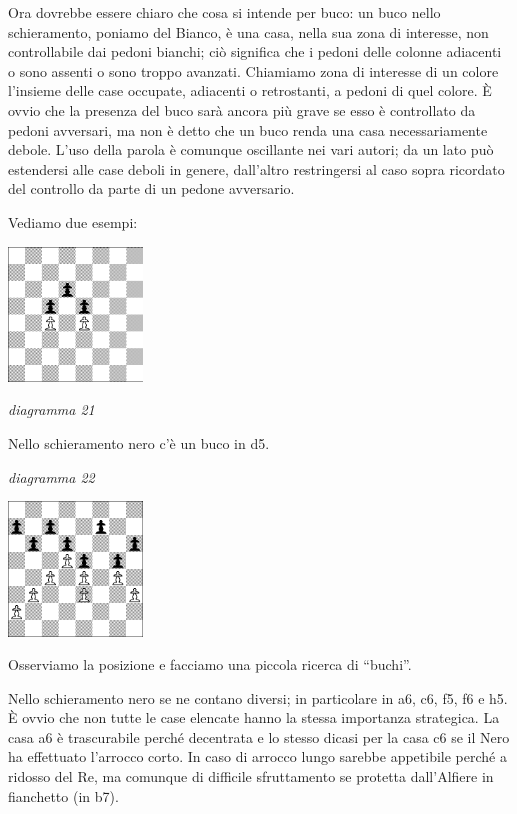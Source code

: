 \documentclass[
]{article}
\begin{document}
Ora dovrebbe essere chiaro che cosa si intende per buco: un buco nello
schieramento, poniamo del Bianco, è una casa, nella sua zona di
interesse, non controllabile dai pedoni bianchi; ciò significa che i
pedoni delle colonne adiacenti o sono assenti o sono troppo avanzati.
Chiamiamo zona di interesse di un colore l'insieme delle case occupate,
adiacenti o retrostanti, a pedoni di quel colore. È ovvio che la
presenza del buco sarà ancora più grave se esso è controllato da pedoni
avversari, ma non è detto che un buco renda una casa necessariamente
debole. L'uso della parola è comunque oscillante nei vari autori; da un
lato può estendersi alle case deboli in genere, dall'altro restringersi
al caso sopra ricordato del controllo da parte di un pedone avversario.

Vediamo due esempi:

\includegraphics[width=1.40556in,height=1.40903in]{vertopal_109f12be458a423d8f3cc838880eaea2/media/image21.png}

\emph{diagramma 21}

Nello schieramento nero c'è un buco in d5.

\emph{diagramma 22}

\includegraphics[width=1.40972in,height=1.40972in]{vertopal_109f12be458a423d8f3cc838880eaea2/media/image22.png}

Osserviamo la posizione e facciamo una piccola ricerca di ``buchi''.

Nello schieramento nero se ne contano diversi; in particolare in a6, c6,
f5, f6 e h5. È ovvio che non tutte le case elencate hanno la stessa
importanza strategica. La casa a6 è trascurabile perché decentrata e lo
stesso dicasi per la casa c6 se il Nero ha effettuato l'arrocco corto.
In caso di arrocco lungo sarebbe appetibile perché a ridosso del Re, ma
comunque di difficile sfruttamento se protetta dall'Alfiere in
fianchetto (in b7).
\end{document}
